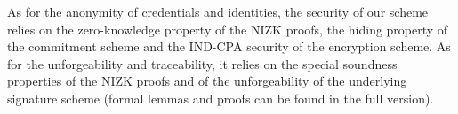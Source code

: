 

As for the anonymity of credentials and identities, the security of our 
scheme relies on the zero-knowledge property of the NIZK proofs, the 
hiding property of the commitment scheme and the IND-CPA security of the 
encryption scheme.  As for the unforgeability and traceability, it 
relies on the special soundness properties of the NIZK proofs and of the 
unforgeability of the underlying signature scheme (formal lemmas and 
proofs can be found in the full version).




